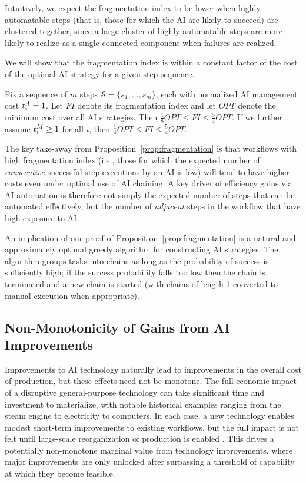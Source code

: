Intuitively, we expect the fragmentation index to be lower when highly automatable steps (that is, those for which the AI are likely to succeed) are clustered together, since a large cluster of highly automatable steps are more likely to realize as a single connected component when failures are realized.

We will show that the fragmentation index is within a constant factor of the cost of the optimal AI strategy for a given step sequence.

\begin{proposition}
\label{prop:fragmentation}
   Fix a sequence of $m$ steps $\mathcal{S} = \{s_1, \dotsc, s_m\}$, each with normalized AI management cost $t^{A}_{i} = 1$.
   Let $FI$ denote its fragmentation index and let $OPT$ denote the minimum cost over all AI strategies.
   Then $\tfrac{1}{8}OPT \leq FI \leq \tfrac{5}{4}OPT$.
   If we further assume $t^{M}_{i} \geq 1$ for all $i$, then $\tfrac{1}{4}OPT \leq FI \leq \tfrac{5}{4}OPT$.
\end{proposition}

The key take-away from Proposition~\ref{prop:fragmentation} is that workflows with high fragmentation index (i.e., those for which the expected number of \emph{consecutive} successful step executions by an AI is low) will tend to have higher costs even under optimal use of AI chaining.
A key driver of efficiency gains via AI automation is therefore not simply the expected number of steps that can be automated effectively, but the number of \emph{adjacent} steps in the workflow that have high exposure to AI.

An implication of our proof of Proposition~\ref{prop:fragmentation} is a natural and approximately optimal greedy algorithm for constructing AI strategies.
The algorithm groups tasks into chains as long as the probability of success is sufficiently high; if the success probability falls too low then the chain is terminated and a new chain is started (with chains of length 1 converted to manual execution when appropriate).



\subsection{Non-Monotonicity of Gains from AI Improvements}
\label{sec:nonlinear}

Improvements to AI technology naturally lead to improvements in the overall cost of production, but these effects need not be monotone.
The full economic impact of a disruptive general-purpose technology can take significant time and investment to materialize, with notable historical examples ranging from the steam engine to electricity to computers.
In each case, a new technology enables modest short-term improvements to existing workflows, but the full impact is not felt until large-scale reorganization of production is enabled \citep{brynjolfsson2021productivity}.
This drives a potentially non-monotone marginal value from technology improvements, where major improvements are only unlocked after surpassing a threshold of capability at which they become feasible.


